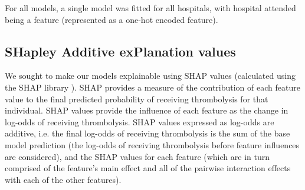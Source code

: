 For all models, a single model was fitted for all hospitals, with hospital attended being a feature (represented as a one-hot encoded feature).

\iffalse
\subsection{Characteristics of the most thrombolysable patient (at each hospital)}
We identified the patient at each hospital that the model predicted had the highest probability of receiving thrombolysis (using the combined test-set results from the \emph{k-fold model}), and compared the feature values of those 132 patients to:
\begin{itemize}
\item All patients
\item All patients who had received thrombolysis
\item All patients who had not received thrombolysis
\end{itemize}
\fi

\subsection{SHapley Additive exPlanation values}

We sought to make our models explainable using SHAP values (calculated using the SHAP library \cite{lundberg_unified_2017}). SHAP provides a measure of the contribution of each feature value to the final predicted probability of receiving thrombolysis for that individual. SHAP values provide the influence of each feature as the change in log-odds of receiving thrombolysis. SHAP values expressed as log-odds are additive, i.e. the final log-odds of receiving thrombolysis is the sum of the base model prediction (the log-odds of receiving thrombolysis before feature influences are considered), and the SHAP values for each feature (which are in turn comprised of the feature's main effect and all of the pairwise interaction effects with each of the other features). 




